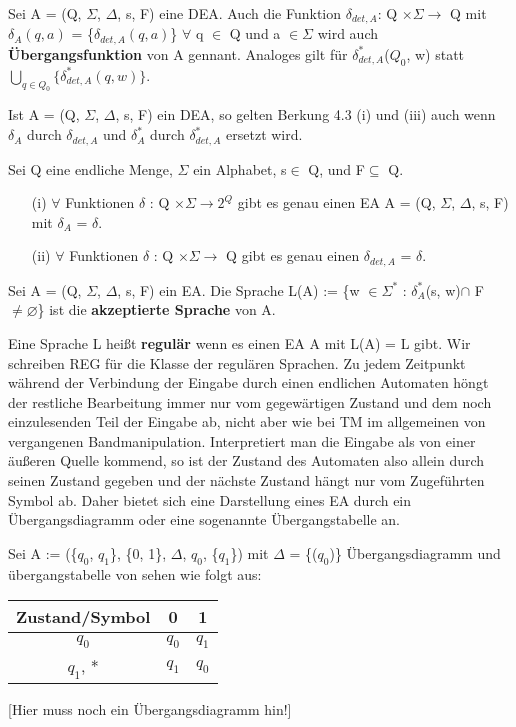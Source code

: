 Sei A = (Q, $\Sigma$,  $\Delta$, s, F) eine DEA. Auch die Funktion $\delta_{det, A}$: Q $\times \Sigma \rightarrow$ Q mit $\delta_{A}(q,a)$ = \{$\delta_{det, A}(q, a)$\} $\forall$ q $\in$ Q und a $\in \Sigma$ wird auch \textbf{Übergangsfunktion} von A gennant. Analoges gilt für $\delta_{det, A}^{*}$($Q_{0}$, w) statt $\bigcup \limits_{q \in Q_{0}}\{\delta_{det, A}^{*}(q, w)\}$.

Ist A = (Q, $\Sigma$, $\Delta$, s, F) ein DEA, so gelten Berkung 4.3 (i) und (iii) auch wenn $\delta_{A}$ durch $\delta_{det, A}$ und $\delta_{A}^{*}$ durch $\delta_{det, A}^{*}$ ersetzt wird.

Sei Q eine endliche Menge, $\Sigma$ ein Alphabet, s$\in$ Q, und F$\subseteq$ Q. 

\begin{itemize}
    \item [(i)] $\forall$ Funktionen $\delta$ : Q $\times \Sigma \rightarrow 2^{Q}$ gibt es genau einen EA A = (Q, $\Sigma$, $\Delta$, s, F) mit $\delta_{A}$ = $\delta$.
    \item [(ii)] $\forall$ Funktionen $\delta$ : Q $\times \Sigma \rightarrow$ Q gibt es genau einen $\delta_{det, A}$ = $\delta$. 
\end{itemize}

Sei A = (Q, $\Sigma$, $\Delta$, s, F) ein EA. Die Sprache L(A) := \{w $\in \Sigma^{*}$ : $\delta_{A}^{*}$(s, w)$\cap$ F $\neq \varnothing $\} ist die \textbf{akzeptierte Sprache} von A.

Eine Sprache L heißt \textbf{regulär} wenn es einen EA A mit L(A) = L gibt. Wir schreiben REG für die Klasse der regulären Sprachen. Zu jedem Zeitpunkt während der Verbindung der Eingabe durch einen endlichen Automaten höngt der restliche Bearbeitung immer nur vom gegewärtigen Zustand und dem noch einzulesenden Teil der Eingabe ab, nicht aber wie bei TM im allgemeinen von vergangenen Bandmanipulation. Interpretiert man die Eingabe als von einer äußeren Quelle kommend, so ist der  Zustand des Automaten also allein durch seinen Zustand gegeben und der nächste Zustand hängt nur vom Zugeführten Symbol ab. Daher bietet sich eine Darstellung eines EA durch ein Übergangsdiagramm oder eine sogenannte Übergangstabelle an.

Sei A := (\{$q_{0}$, $q_{1}$\}, \{0, 1\}, $\Delta$, $q_{0}$, \{$q_{1}$\}) mit $\Delta$ = \{($q_{0}$)\}
Übergangsdiagramm und übergangstabelle von sehen wie folgt aus:
\begin{center}
    \begin{tabular}{|c|c|c|}
        \hline
        \textbf{Zustand/Symbol} & \textbf{0} & \textbf{1} \\
        \hline
        $q_{0}$ & $q_{0}$ & $q_{1}$ \\
        \hline
        $q_{1}$, * & $q_{1}$ & $q_{0}$ \\
        \hline
    \end{tabular}            
\end{center}
[Hier muss noch ein Übergangsdiagramm hin!]



